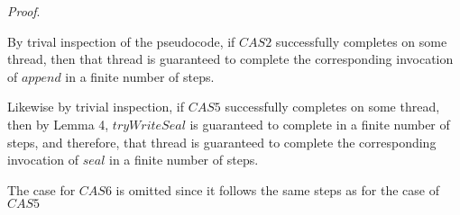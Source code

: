 \documentclass[runningheads,a4paper]{llncs}
\begin{document}
\textit{Proof}. 

By trival inspection of the pseudocode, if $CAS2$ successfully completes on
some thread, then that thread is guaranteed to complete the corresponding
invocation of $append$ in a finite number of steps.

Likewise by trivial inspection, if $CAS5$ successfully completes on some
thread, then by Lemma 4, $tryWriteSeal$ is guaranteed to complete in a finite
number of steps, and therefore, that thread is guaranteed to complete the
corresponding invocation of $seal$ in a finite number of steps.

The case for $CAS6$ is omitted since it follows the same steps as for the case
of $CAS5$

\pagebreak
\end{document}
